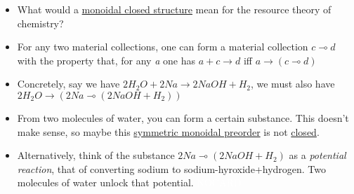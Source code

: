 \begin{itemize}
    \item What would a \hyperref[D2.79]{monoidal closed structure} mean for the resource theory of chemistry?
    \item For any two material collections, one can form a material collection $c \multimap d$ with the property that, for any \emph{a} one has $a + c \rightarrow d$ iff $a \rightarrow (c \multimap d)$
    \item Concretely, say we have $2 H_2O + 2 Na \rightarrow 2 NaOH + H_2$, we must also have $2H_2O \rightarrow (2Na \multimap (2NaOH+H_2))$
    \item From two molecules of water, you can form a certain substance. This doesn't make sense, so maybe this \hyperref[D2.2]{symmetric monoidal preorder} is not \hyperref[D2.79]{closed}.
    \item Alternatively, think of the substance $2Na \multimap (2NaOH+H_2)$ as a \emph{potential reaction}, that of converting sodium to sodium-hyroxide+hydrogen. Two molecules of water unlock that potential. \textcolor{white}{NOCARD}
  \end{itemize}